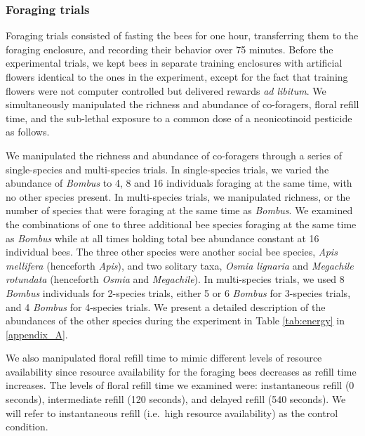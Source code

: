 \begin{refsection}
\subsubsection*{Foraging trials}

Foraging trials consisted of fasting the bees for one hour, transferring them to the foraging enclosure, and recording their behavior over 75 minutes. Before the experimental trials, we kept bees in separate training enclosures with artificial flowers identical to the ones in the experiment, except for the fact that training flowers were not computer controlled but delivered rewards \textit{ad libitum}. We simultaneously manipulated the richness and abundance of co-foragers, floral refill time, and the sub-lethal exposure to a common dose of a neonicotinoid pesticide as follows.

We manipulated the richness and abundance of co-foragers through a series of single-species and multi-species trials. In single-species trials, we varied the abundance of \textit{Bombus} to 4, 8 and 16 individuals foraging at the same time, with no other species present. In multi-species trials, we manipulated richness, or the number of species that were foraging at the same time as \textit{Bombus}. We examined the combinations of one to three additional bee species foraging at the same time as \textit{Bombus} while at all times holding total bee abundance constant at 16 individual bees. The three other species were another social bee species, \textit{Apis mellifera} (henceforth \textit{Apis}), and two solitary taxa, \textit{Osmia lignaria} and \textit{Megachile rotundata} (henceforth \textit{Osmia} and \textit{Megachile}). In multi-species trials, we used 8 \textit{Bombus} individuals for 2-species trials, either 5 or 6 \textit{Bombus} for 3-species trials, and 4 \textit{Bombus} for 4-species trials. We present a detailed description of the abundances of the other species during the experiment in Table \ref{tab:energy} in \autoref{appendix_A}.

We also manipulated floral refill time to mimic different levels of resource availability since resource availability for the foraging bees decreases as refill time increases. The levels of floral refill time we examined were: instantaneous refill (0 seconds), intermediate refill (120 seconds), and delayed refill (540 seconds). We will refer to instantaneous refill (i.e.\ high resource availability) as the control condition.


\end{refsection}
